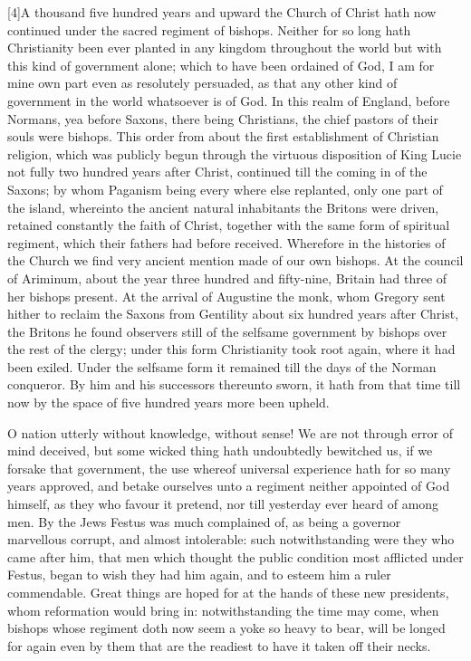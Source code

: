 [4]A thousand five hundred years and upward the Church of Christ hath now continued under the sacred regiment of bishops. Neither for so long hath Christianity been ever planted in any kingdom throughout the world but with this kind of government alone; which to have been ordained of God, I am for mine own part even as resolutely persuaded, as that any other kind of government in the world whatsoever is of God. In this realm of England, before Normans, yea before Saxons, there being Christians, the chief pastors of their souls were bishops. This order from about the first establishment of Christian religion, which was publicly begun through the virtuous disposition of King Lucie not fully two hundred years after Christ, continued till the coming in of the Saxons; by whom Paganism being every where else replanted, only one part of the island, whereinto the ancient  natural inhabitants the Britons were driven, retained constantly the faith of Christ, together with the same form of spiritual regiment, which their fathers had before received. Wherefore in the histories of the Church we find very ancient mention made of our own bishops. At the council of Ariminum, about the year three hundred and fifty-nine, Britain had three of her bishops present. At the arrival of Augustine the monk, whom Gregory sent hither to reclaim the Saxons from Gentility about six hundred years after Christ, the Britons he found observers still of the selfsame government by bishops over the rest of the clergy; under this form Christianity took root again, where it had been exiled. Under the selfsame form it remained till the days of the Norman conqueror. By him and his successors thereunto sworn, it hath from that time till now by the space of five hundred years more been upheld.

O nation utterly without knowledge, without sense! We are not through error of mind deceived, but some wicked thing hath undoubtedly bewitched us, if we forsake that government, the use whereof universal experience hath for so many years approved, and betake ourselves unto a regiment neither appointed of God himself, as they who favour it pretend, nor till yesterday ever heard of among men. By the Jews Festus was much complained of, as being a governor  marvellous corrupt, and almost intolerable:
 such notwithstanding were they who came after him, that men which thought the public condition most afflicted under Festus, began to wish they had him again, and to esteem him a ruler commendable. Great things are hoped for at the hands of these new presidents, whom reformation would bring in: notwithstanding the time may come, when bishops whose regiment doth now seem a yoke so heavy to bear, will be longed for again even by them that are the readiest to have it taken off their necks.

